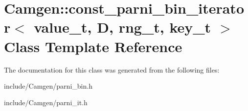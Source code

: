 \hypertarget{a00102}{\section{Camgen\-:\-:const\-\_\-parni\-\_\-bin\-\_\-iterator$<$ value\-\_\-t, D, rng\-\_\-t, key\-\_\-t $>$ Class Template Reference}
\label{a00102}
}


The documentation for this class was generated from the following files\-:\begin{DoxyCompactItemize}
\item 
include/\-Camgen/parni\-\_\-bin.\-h\item 
include/\-Camgen/parni\-\_\-it.\-h\end{DoxyCompactItemize}
